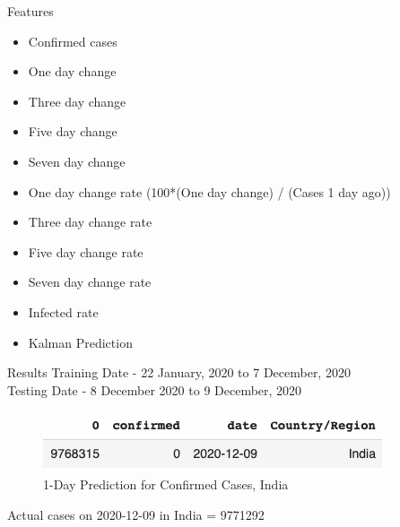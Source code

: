 \documentclass[11pt]{beamer}
\begin{document}
\begin{frame}{Features}
\begin{itemize}
\item Confirmed cases
\item One day change
\item Three day change
\item Five day change
\item Seven day change
\item One day change rate (100*(One day change) / (Cases 1 day ago))
\item Three day change rate
\item Five day change rate
\item Seven day change rate
\item Infected rate
\item Kalman Prediction
\end{itemize}
\end{frame}


\begin{frame}{Results}
Training Date - 22 January, 2020 to 7 December, 2020 \\
Testing Date - 8 December 2020 to 9 December, 2020
\begin{figure}
\includegraphics[scale=0.5]{kal_1day}
\caption{1-Day Prediction  for Confirmed Cases, India}
\end{figure}

\begin{center}
Actual cases on 2020-12-09 in India = 9771292
\end{center}
\end{frame}
\end{document}
